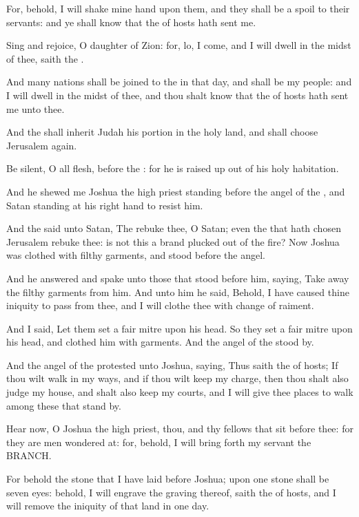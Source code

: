 \Verse For, behold, I will shake mine hand upon them, and they shall be a spoil to their servants: and ye shall know that the \LORD of hosts hath sent me.

\Verse Sing and rejoice, O daughter of Zion: for, lo, I come, and I will dwell in the midst of thee, saith the \LORD.

\Verse And many nations shall be joined to the \LORD in that day, and shall be my people: and I will dwell in the midst of thee, and thou shalt know that the \LORD of hosts hath sent me unto thee.

\Verse And the \LORD shall inherit Judah his portion in the holy land, and shall choose Jerusalem again.

\Verse Be silent, O all flesh, before the \LORD: for he is raised up out of his holy habitation.


\Chapter
\Verse And he shewed me Joshua the high priest standing before the angel of the \LORD, and Satan standing at his right hand to resist him.

\Verse And the \LORD said unto Satan, The \LORD rebuke thee, O Satan; even the \LORD that hath chosen Jerusalem rebuke thee: is not this a brand plucked out of the fire?  \Verse Now Joshua was clothed with filthy garments, and stood before the angel.

\Verse And he answered and spake unto those that stood before him, saying, Take away the filthy garments from him. And unto him he said, Behold, I have caused thine iniquity to pass from thee, and I will clothe thee with change of raiment.

\Verse And I said, Let them set a fair mitre upon his head. So they set a fair mitre upon his head, and clothed him with garments. And the angel of the \LORD stood by.

\Verse And the angel of the \LORD protested unto Joshua, saying, \Verse Thus saith the \LORD of hosts; If thou wilt walk in my ways, and if thou wilt keep my charge, then thou shalt also judge my house, and shalt also keep my courts, and I will give thee places to walk among these that stand by.

\Verse Hear now, O Joshua the high priest, thou, and thy fellows that sit before thee: for they are men wondered at: for, behold, I will bring forth my servant the BRANCH.

\Verse For behold the stone that I have laid before Joshua; upon one stone shall be seven eyes: behold, I will engrave the graving thereof, saith the \LORD of hosts, and I will remove the iniquity of that land in one day.


